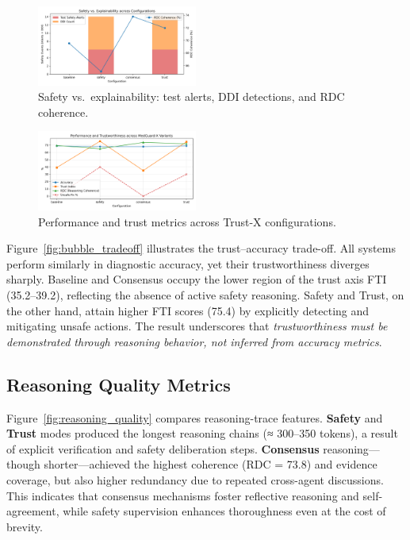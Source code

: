 \documentclass[letterpaper]{article} %
\begin{document}
\begin{figure}[t]
\centering
\includegraphics[width=0.47\textwidth]{fig4_safety_vs_explainability.png}
\caption{Safety vs.\ explainability: test alerts, DDI detections, and RDC coherence.}
\label{fig:safety_explainability}
\end{figure}

\begin{figure}[t][h]
\centering
\includegraphics[width=0.47\textwidth]{fig1_performance_trust.png}
\caption{Performance and trust metrics across Trust-X configurations.}
\label{fig:perf_trust}
\end{figure}

Figure~\ref{fig:bubble_tradeoff} illustrates the trust–accuracy trade-off.  
All systems perform similarly in diagnostic accuracy, yet their trustworthiness diverges sharply.  
Baseline and Consensus occupy the lower region of the trust axis FTI (35.2–39.2), reflecting the absence of active safety reasoning.  
Safety and Trust, on the other hand, attain higher FTI scores (75.4) by explicitly detecting and mitigating unsafe actions.  
The result underscores that \emph{trustworthiness must be demonstrated through reasoning behavior, not inferred from accuracy metrics}.

\subsection{Reasoning Quality Metrics}

Figure~\ref{fig:reasoning_quality} compares reasoning-trace features.  
\textbf{Safety} and \textbf{Trust} modes produced the longest reasoning chains (≈ 300–350 tokens), a result of explicit verification and safety deliberation steps.  
\textbf{Consensus} reasoning—though shorter—achieved the highest coherence (RDC = 73.8) and evidence coverage, but also higher redundancy due to repeated cross-agent discussions.  
This indicates that consensus mechanisms foster reflective reasoning and self-agreement, while safety supervision enhances thoroughness even at the cost of brevity.
\end{document}
